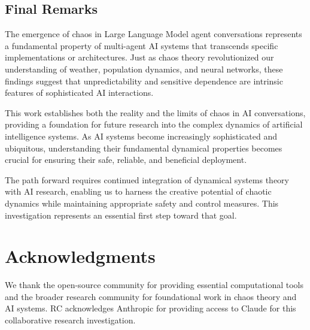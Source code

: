 \documentclass[11pt,a4paper]{article}
\begin{document}
\subsection{Final Remarks}

The emergence of chaos in Large Language Model agent conversations represents a fundamental property of multi-agent AI systems that transcends specific implementations or architectures. Just as chaos theory revolutionized our understanding of weather, population dynamics, and neural networks, these findings suggest that unpredictability and sensitive dependence are intrinsic features of sophisticated AI interactions.

This work establishes both the reality and the limits of chaos in AI conversations, providing a foundation for future research into the complex dynamics of artificial intelligence systems. As AI systems become increasingly sophisticated and ubiquitous, understanding their fundamental dynamical properties becomes crucial for ensuring their safe, reliable, and beneficial deployment.

The path forward requires continued integration of dynamical systems theory with AI research, enabling us to harness the creative potential of chaotic dynamics while maintaining appropriate safety and control measures. This investigation represents an essential first step toward that goal.

\section*{Acknowledgments}

We thank the open-source community for providing essential computational tools and the broader research community for foundational work in chaos theory and AI systems. RC acknowledges Anthropic for providing access to Claude for this collaborative research investigation.
\end{document}

